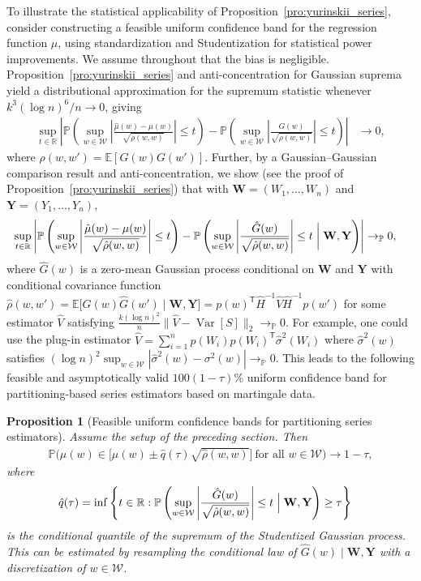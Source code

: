 \documentclass[11pt,lof]{puthesis}
\renewcommand{\P}{\ensuremath{\mathbb{P}}}
\newcommand{\R}{\ensuremath{\mathbb{R}}}
\newcommand{\E}{\ensuremath{\mathbb{E}}}
\newcommand{\bW}{\ensuremath{\mathbf{W}}}
\newcommand{\bY}{\ensuremath{\mathbf{Y}}}
\newcommand{\cW}{\ensuremath{\mathcal{W}}}
\newcommand{\T}{\ensuremath{\mathsf{T}}}
\DeclareMathOperator{\Var}{Var}
\theoremstyle{break}
\newtheorem{proposition}{Proposition}[section]
\theoremstyle{proof}
\begin{document}
To illustrate the statistical applicability of
Proposition~\ref{pro:yurinskii_series}, consider constructing a feasible uniform
confidence band for the regression function $\mu$, using standardization and
Studentization for statistical power improvements. We assume throughout that
the bias is negligible. Proposition~\ref{pro:yurinskii_series} and
anti-concentration for
Gaussian suprema \citep[Corollary~2.1]{chernozhukov2014anti} yield
a distributional approximation for the supremum statistic whenever
$k^3(\log n)^6 / n \to 0$, giving
%
\begin{align*}
\sup_{t \in \R}
\left|
\P\left(
\sup_{w \in \cW}
\left|
\frac{\hat\mu(w)-\mu(w)}{\sqrt{\rho(w,w)}}
\right| \leq t
\right)
-
\P\left(
\sup_{w \in \cW}
\left|
\frac{G(w)}{\sqrt{\rho(w,w)}}
\right| \leq t
\right)
\right|
&\to 0,
\end{align*}
%
where $\rho(w,w') = \E[G(w)G(w')]$. Further, by a Gaussian--Gaussian
comparison result \citep[Lemma~3.1]{chernozhukov2013gaussian} and
anti-concentration, we show (see the proof of
Proposition~\ref{pro:yurinskii_series}) that with $\bW = (W_1, \ldots, W_n)$ and
$\bY = (Y_1, \ldots, Y_n)$,
%
\begin{align*}
\sup_{t \in \R}
\left|
\P\left(
\sup_{w \in \cW}
\left|
\frac{\hat\mu(w)-\mu(w)}{\sqrt{\hat\rho(w,w)}}
\right| \leq t
\right)
- \P\left(
\sup_{w \in \cW}
\left|
\frac{\hat G(w)}{\sqrt{\hat\rho(w,w)}}
\right| \leq t \biggm| \bW, \bY
\right)
\right|
&\to_\P 0,
\end{align*}
%
where $\hat G(w)$ is a zero-mean Gaussian process
conditional on $\bW$ and $\bY$ with conditional covariance function
$\hat\rho(w,w')
=\E\big[\hat G(w) \hat G(w') \mid \bW, \bY \big]
= p(w)^\T \hat H^{-1} \hat V \hat H^{-1}p(w')$
for some estimator $\hat V$ satisfying
$\frac{k (\log n)^2}{n}
\big\|\hat V-\Var[S]\big\|_2 \to_\P 0$.
For example, one could use the plug-in estimator
$\hat V=\sum_{i=1}^n p(W_i) p(W_i)^\T \hat{\sigma}^2(W_i)$
where $\hat{\sigma}^2(w)$ satisfies
$(\log n)^2 \sup_{w \in \cW}
|\hat{\sigma}^2(w)-\sigma^2(w)| \to_\P 0$.
This leads to the following feasible and asymptotically valid
$100(1-\tau)\%$
uniform confidence band for partitioning-based series estimators
based on martingale data.

\begin{proposition}[Feasible uniform confidence bands for partitioning
series estimators]%
\label{pro:yurinskii_series_feasible}
%
Assume the setup of the preceding section. Then
%
\begin{align*}
\P\Big(
\mu(w) \in
\Big[
\hat\mu(w) \pm \hat q(\tau)
\sqrt{\hat\rho(w,w)}
\Big]
\ \text{for all }
w \in \cW \Big)
\to 1-\tau,
\end{align*}
%
where
%
\begin{align*}
\hat{q}(\tau)
&=
\inf
\left\{
t \in \R:
\P\left(
\sup_{w \in \cW}
\left|
\frac{\hat G(w)}{\sqrt{\hat\rho(w,w)}}
\right|
\leq t
\Bigm| \bW, \bY
\right)
\geq \tau
\right\}
\end{align*}
%
is the conditional quantile of the supremum of the Studentized Gaussian
process. This can be estimated by resampling the conditional law of
$\hat G(w) \mid \bW, \bY$ with a discretization of $w \in \cW$.
\end{proposition}
\end{document}
